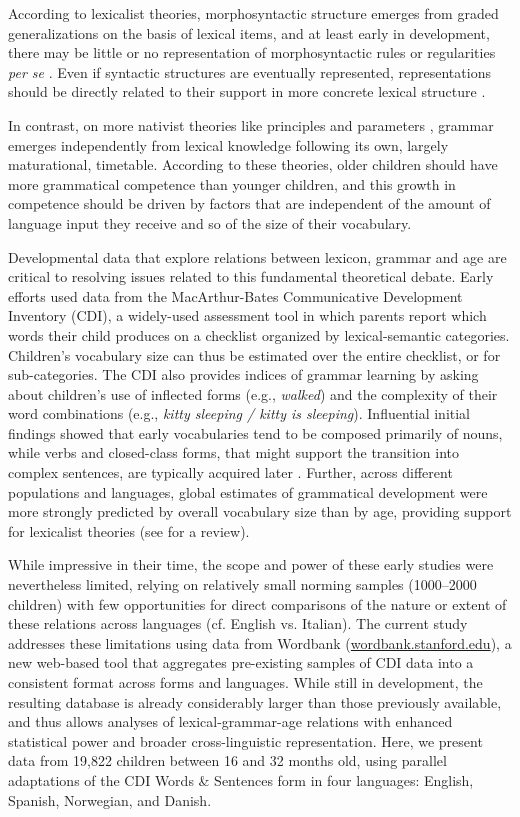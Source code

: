 \documentclass[10pt,letterpaper]{article}
\begin{document}
According to lexicalist theories, morphosyntactic structure emerges from graded generalizations on the basis of lexical items, and at least early in development, there may be little or no representation of morphosyntactic rules or regularities \emph{per se} \cite{tomasello2003}. Even if syntactic structures are eventually represented, representations should be directly related to their support in more concrete lexical structure \cite{bannard2009}.

In contrast, on more nativist theories like principles and parameters \cite{chomsky1981, baker2005}, grammar emerges independently from lexical knowledge following its own, largely maturational, timetable. According to these theories, older children should have more grammatical competence than younger children, and this growth in competence should be driven by factors that are independent of the amount of language input they receive and so of the size of their vocabulary.

Developmental data that explore relations between lexicon, grammar and age are critical to resolving issues related to this fundamental theoretical debate. Early efforts used data from the MacArthur-Bates Communicative Development Inventory (CDI), a widely-used assessment tool in which parents report which words their child produces on a checklist organized by lexical-semantic categories. Children's vocabulary size can thus be estimated over the entire checklist, or for sub-categories. The CDI also provides indices of grammar learning by asking about children's use of inflected forms (e.g., \emph{walked}) and the complexity of their word combinations (e.g., \emph{kitty sleeping / kitty is sleeping}). Influential initial findings showed that early vocabularies tend to be composed primarily of nouns, while verbs and closed-class forms, that might support the transition into complex sentences, are typically acquired later \cite{bates1994}. Further, across different populations and languages, global estimates of grammatical development were more strongly predicted by overall vocabulary size than by age, providing support for lexicalist theories (see  for a review).


While impressive in their time, the scope and power of these early studies were nevertheless limited, relying on relatively small norming samples (1000--2000 children) with few opportunities for direct comparisons of the nature or extent of these relations across languages (cf. English vs. Italian). The current study addresses these limitations using data from Wordbank (\url{wordbank.stanford.edu}), a new web-based tool that aggregates pre-existing samples of CDI data into a consistent format across forms and languages. While still in development, the resulting database is already considerably larger than those previously available, and thus allows analyses of lexical-grammar-age relations with enhanced statistical power and broader cross-linguistic representation. Here, we present data from 19,822 children between 16 and 32 months old, using parallel adaptations of the CDI Words \& Sentences form in four languages: English, Spanish, Norwegian, and Danish.
\end{document}
